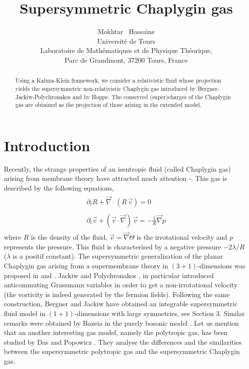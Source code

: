\documentclass[11pt,a4paper]{article}
\title{Supersymmetric Chaplygin gas}
\author{Mokhtar ~Hassa\"{\i}ne\\
Universit\'e de
Tours\\
Laboratoire de Math\'ematiques et de Physique Th\'eorique,\\
Parc
de Grandmont, 37200 Tours,
France}
\let\ssection=\section
\renewcommand{\section}{\setcounter{equation}{0}\ssection}
\begin{document}
\maketitle
\begin{abstract}
Using a Kaluza-Klein framework, we consider a relativistic fluid whose projection yields the supersymmetric non-relativistic Chaplygin gas introduced by Bergner-Jackiw-Polychronakos and by Hoppe. The conserved (super)charges of the Chaplygin gas are obtained as the projection of those arising in the extended model.
\end{abstract}
\section{Introduction}
Recently, the strange properties of an isentropic fluid (called Chaplygin gas) arising from membrane theory have attracted much attention \cite{JP}-\cite{HH}. This gas is described by the following equations,
\begin{eqnarray}
\begin{array}{l}
\partial_tR+\vec{\nabla}\cdot(R\,\vec{v})=0\\
[0.5mm]\\
\partial_t\vec{v}+(\vec{v}\cdot\vec{\nabla})\,\vec{v}=-\displaystyle{\frac{1}{R}\vec{\nabla}p}
\end{array}
\label{1}
\end{eqnarray}
where $R$ is the density of the fluid, $\vec{v}=\vec{\nabla}\Theta$ is the irrotational velocity and $p$ represents the pressure. This fluid is characterised by a negative pressure $-2\lambda/R$ ($\lambda$ is a positif constant). The supersymmetric generalization of the planar Chaplygin gas arising from a supermembrane theory in $(3+1)$-dimensions was proposed in \cite{JP} and \cite{HOP}. Jackiw and Polychronakos \cite{JP}, in particular introduced anticommuting Grassmann variables in order to get a non-irrotational velocity (the vorticity is indeed generated by the fermion fields).
Following the same construction, Bergner and Jackiw \cite{BJ} have
obtained an integrable supersymmetric fluid model in
$(1+1)$-dimensions with large symmetries, see Section $3$. Similar
remarks were obtained by Bazeia in the purely bosonic model
\cite{BB}. Let us mention that an another interesting gas model,
namely the polytropic gas, has been studied by Das and Popowicz
\cite{DAS}. They analyse the differences and the similarities between
the supersymmetric polytropic gas and the supersymmetric Chaplygin gas. 
\end{document}
